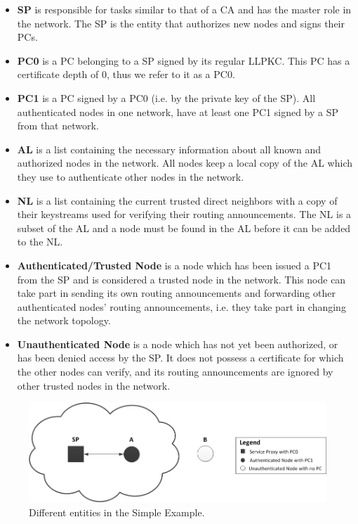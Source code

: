 \begin{itemize}
  \item \textbf{\acf{SP}} is responsible for tasks similar to that of a \ac{CA}
  	and has the master role in the network. The \ac{SP} is the entity that
 	authorizes new nodes and signs their \acp{PC}.
  \item \textbf{\acf{PC0}} is a \ac{PC} belonging to a \ac{SP} signed by its
    regular \ac{LLPKC}. This \ac{PC} has a certificate depth of 0, thus we refer
    to it as a \ac{PC0}.
  \item \textbf{\acf{PC1}} is a \ac{PC} signed by a \ac{PC0} (i.e. by the
    private key of the \ac{SP}). All authenticated nodes in one network, have at
    least one \ac{PC1} signed by a \ac{SP} from that network.
  \item \textbf{\acf{AL}} is a list containing the necessary information about
 	all known and authorized nodes in the network. All nodes keep a local copy of
 	the \ac{AL} which they use to authenticate other nodes in the network.
  \item \textbf{\acf{NL}} is a list containing the current trusted direct
    neighbors with a copy of their keystreams used for verifying their routing
    announcements. The \ac{NL} is a subset of the \ac{AL} and a node must be
    found in the \ac{AL} before it can be added to the \ac{NL}.
  \item \textbf{Authenticated/Trusted Node} is a node which has been issued a
    \ac{PC1} from the \ac{SP} and is considered a trusted node in the network.
    This node can take part in sending its own routing announcements and
    forwarding other authenticated nodes' routing announcements, i.e. they take
    part in changing the network topology.
  \item \textbf{Unauthenticated Node} is a node which has not yet been
    authorized, or has been denied access by the \ac{SP}. It does not possess a
    certificate for which the other nodes can verify, and its routing
    announcements are ignored by other trusted nodes in the network.
\end{itemize}

\begin{figure}[h]
	\centering
  	\includegraphics[width=\textwidth]{images/simple_example_entities.png}
  	\caption{Different entities in the Simple Example.}
	\label{fig:simple_example_entities}
\end{figure}

